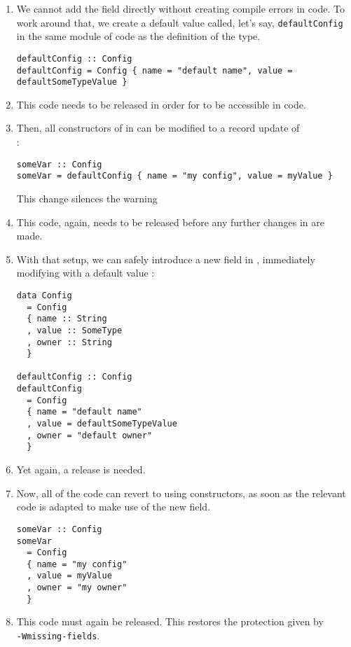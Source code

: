 \documentclass[en]{pracamgr}
\newcommand{\code}[1]{\lstinline[breaklines=true]{#1}}
\begin{document}
\begin{enumerate}
  \item We cannot add the field directly without creating compile errors in \user{} code. 
  To work around that, we create a default value called, let's say, \code{defaultConfig} in the same module of \infra{} code as 
  the definition of the type.\\
  \begin{minipage}{\linewidth}
    \begin{lstlisting}
defaultConfig :: Config
defaultConfig = Config { name = "default name", value = defaultSomeTypeValue }
    \end{lstlisting}
  \end{minipage}
  \item This code needs to be released in order for  to be accessible in \user{} code.
  \item Then, all constructors of \conf{} in \user{} can be modified to a record update of \\
  :\\
  \begin{minipage}{\linewidth}
    \begin{lstlisting}
someVar :: Config
someVar = defaultConfig { name = "my config", value = myValue }
    \end{lstlisting}
  \end{minipage}
  This change silences the warning 
  \item This code, again, needs to be released before any further changes in \infra{} are made.
  \item With that setup, we can safely introduce a new field in \infra{}, immediately modifying  with a default value :\\
  \begin{minipage}{\linewidth}
    \begin{lstlisting}
data Config 
  = Config
  { name :: String
  , value :: SomeType
  , owner :: String
  }

defaultConfig :: Config
defaultConfig 
  = Config 
  { name = "default name"
  , value = defaultSomeTypeValue
  , owner = "default owner" 
  }
    \end{lstlisting}
    \end{minipage}
  \item Yet again, a release is needed.
  \item Now, all of the \user{} code can revert to using constructors, as soon as the relevant code is adapted to make use of the 
  new field. \\
\begin{minipage}{\linewidth}
\begin{lstlisting}
someVar :: Config
someVar 
  = Config
  { name = "my config"
  , value = myValue
  , owner = "my owner"
  }
\end{lstlisting}
\end{minipage}

  \item This \user{} code must again be released. This restores the protection given by \\
  \code{-Wmissing-fields}.
\end{enumerate}
\end{document}

